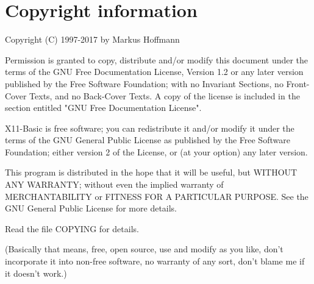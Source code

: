 \section*{Copyright information}

Copyright (C) 1997-2017 by Markus Hoffmann 

Permission is granted to copy, distribute and/or modify this document
under the terms of the GNU Free Documentation License, Version 1.2
or any later version published by the Free Software Foundation;
with no Invariant Sections, no Front-Cover Texts, and no Back-Cover Texts.
A copy of the license is included in the section entitled "GNU
Free Documentation License".

X11-Basic is free software; you can redistribute it and/or modify it under the
terms of the GNU General Public License as published by the Free Software
Foundation; either version 2 of the License, or (at your option) any later
version.

This program is distributed in the hope that it will be useful, but WITHOUT ANY
WARRANTY; without even the implied warranty of MERCHANTABILITY or FITNESS FOR
A PARTICULAR PURPOSE. See the GNU General Public License for more details.

Read the file COPYING for details.

(Basically that means, free, open source, use and modify as you like, don't
incorporate it into non-free software, no warranty of any sort, don't blame me
if it doesn't work.)
